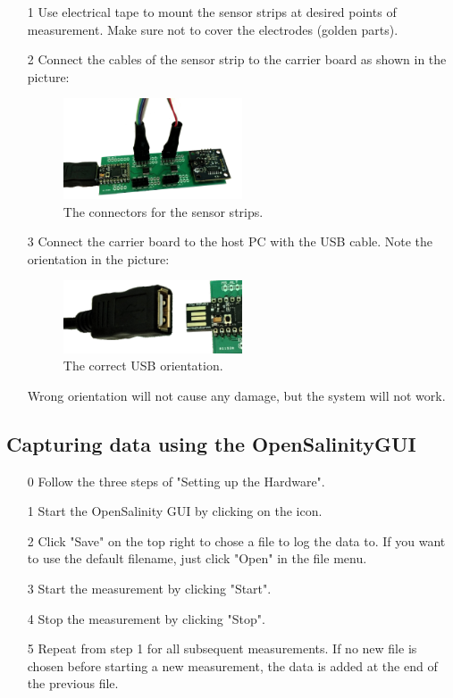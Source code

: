 \begin{itemize}
	\item[1] Use electrical tape to mount the sensor strips at desired points of measurement. Make sure not to cover the electrodes (golden parts).
	\item[2] Connect the cables of the sensor strip to the carrier board as shown in the picture:
	\begin{figure}[H]
	\begin{center}
		\includegraphics[width=0.5\textwidth]{images/conn.jpg}
		\caption{The connectors for the sensor strips.}
		\label{fig:iconna}
	\end{center}
\end{figure}
	\item[3] Connect the carrier board to the host PC with the USB cable. Note the orientation in the picture:
		\begin{figure}[H]
	\begin{center}
		\includegraphics[width=0.5\textwidth]{images/usb.jpg}
		\caption{The correct USB orientation.}
		\label{fig:iusba}
	\end{center}
\end{figure}
	Wrong orientation will not cause any damage, but the system will not work.
\end{itemize}

\subsection*{Capturing data using the OpenSalinityGUI}

\begin{itemize}
	\item[0] Follow the three steps of "Setting up the Hardware".
	\item[1] Start the OpenSalinity GUI by clicking on the icon.
	\item[2] Click "Save" on the top right to chose a file to log the data to. If you want to use the default filename, just click "Open" in the file menu.
	\item[3] Start the measurement by clicking "Start".
	\item[4] Stop the measurement by clicking "Stop".
	\item[5] Repeat from step 1 for all subsequent measurements. If no new file is chosen before starting a new measurement, the data is added at the end of the previous file.
\end{itemize}


